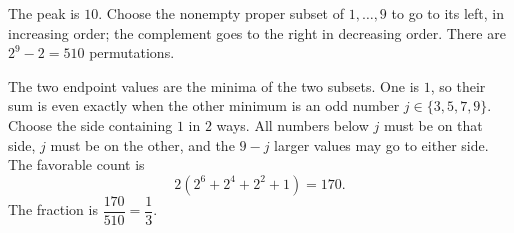 The peak is $10$. Choose the nonempty proper subset of $1,\ldots,9$ to go to its left, in increasing order; the complement goes to the right in decreasing order. There are $2^9-2=510$ permutations.

The two endpoint values are the minima of the two subsets. One is $1$, so their sum is even exactly when the other minimum is an odd number $j\in\{3,5,7,9\}$. Choose the side containing $1$ in $2$ ways. All numbers below $j$ must be on that side, $j$ must be on the other, and the $9-j$ larger values may go to either side. The favorable count is
\[
2(2^6+2^4+2^2+1)=170.
\]
The fraction is $\boxed{\dfrac{170}{510}=\dfrac{1}{3}}$.
